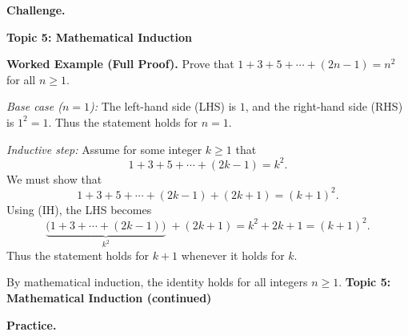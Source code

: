 \documentclass[12pt]{exam}
\newlength{\partskip}
\newcommand{\partspace}{\vspace*{\partskip}}
\begin{document}
\begin{questions}
\newpage
\textbf{Challenge.}

\newpage

\question
\textbf{Topic 5: Mathematical Induction}

\textbf{Worked Example (Full Proof).} Prove that $1+3+5+\cdots+(2n-1)=n^2$ for all $n\ge1$.

\emph{Base case ($n=1$):} The left-hand side (LHS) is $1$, and the right-hand side (RHS) is $1^2=1$. Thus the statement holds for $n=1$.

\emph{Inductive step:} Assume for some integer $k\ge1$ that
\[
1+3+5+\cdots+(2k-1)=k^2.\tag{IH}
\]
We must show that
\[
1+3+5+\cdots+(2k-1)+(2k+1)=(k+1)^2.
\]
Using (IH), the LHS becomes
\[
\underbrace{\bigl(1+3+\cdots+(2k-1)\bigr)}_{k^2}\;+(2k+1)=k^2+2k+1=(k+1)^2.
\]
Thus the statement holds for $k+1$ whenever it holds for $k$.

By mathematical induction, the identity holds for all integers $n\ge1$.
\newpage
\textbf{Topic 5: Mathematical Induction (continued)}

\textbf{Practice.}


\end{questions}
\end{document}
